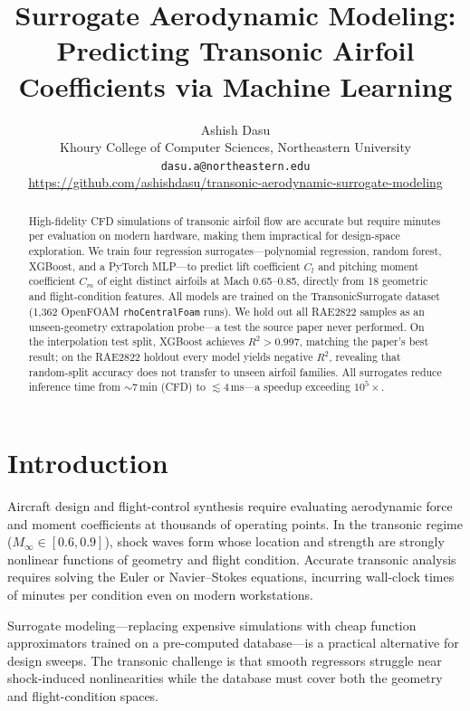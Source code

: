\documentclass[11pt]{article}
\title{\textbf{Surrogate Aerodynamic Modeling:\\
Predicting Transonic Airfoil Coefficients via Machine Learning}}
\author{Ashish Dasu\\
\small Khoury College of Computer Sciences, Northeastern University\\
\small \texttt{dasu.a@northeastern.edu}\\
\small \url{https://github.com/ashishdasu/transonic-aerodynamic-surrogate-modeling}}
\date{}
\begin{document}
\maketitle

\begin{abstract}
High-fidelity CFD simulations of transonic airfoil flow are accurate but
require minutes per evaluation on modern hardware, making them impractical
for design-space exploration. We train four regression surrogates---polynomial
regression, random forest, XGBoost, and a PyTorch MLP---to predict lift
coefficient $C_l$ and pitching moment coefficient $C_m$ of eight distinct
airfoils at Mach 0.65--0.85, directly from 18 geometric and flight-condition
features. All models are trained on the TransonicSurrogate dataset
\cite{elrefaie2024} (1,362 OpenFOAM \texttt{rhoCentralFoam} runs). We hold
out all RAE2822 samples as an unseen-geometry extrapolation probe---a test
the source paper never performed. On the interpolation test split, XGBoost
achieves $R^2>0.997$, matching the paper's best result; on the RAE2822 holdout
every model yields negative $R^2$, revealing that random-split accuracy does
not transfer to unseen airfoil families. All surrogates reduce inference time
from $\sim$7\,min (CFD) to $\lesssim$4\,ms---a speedup exceeding $10^5\times$.
\end{abstract}

\section{Introduction}

Aircraft design and flight-control synthesis require evaluating aerodynamic
force and moment coefficients at thousands of operating points. In the
transonic regime ($M_\infty \in [0.6, 0.9]$), shock waves form whose location
and strength are strongly nonlinear functions of geometry and flight condition.
Accurate transonic analysis requires solving the Euler or Navier--Stokes
equations, incurring wall-clock times of minutes per condition even on modern
workstations.

Surrogate modeling---replacing expensive simulations with cheap function
approximators trained on a pre-computed database---is a practical alternative
for design sweeps. The transonic challenge is that smooth regressors struggle
near shock-induced nonlinearities while the database must cover both the
geometry and flight-condition spaces.
\end{document}
